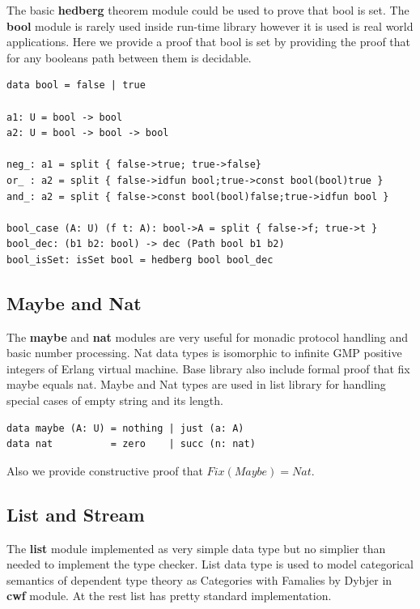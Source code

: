 \documentclass{article}
\begin{document}
The basic {\bf hedberg} theorem module could be used to prove that bool is set.
The {\bf bool} module is rarely used inside run-time library
however it is used is real world applications. Here we provide a proof
that bool is set by providing the proof that for any booleans path
between them is decidable.

\begin{lstlisting}[mathescape=true]
data bool = false | true

a1: U = bool -> bool
a2: U = bool -> bool -> bool

neg_: a1 = split { false->true; true->false}
or_ : a2 = split { false->idfun bool;true->const bool(bool)true }
and_: a2 = split { false->const bool(bool)false;true->idfun bool }

bool_case (A: U) (f t: A): bool->A = split { false->f; true->t }
bool_dec: (b1 b2: bool) -> dec (Path bool b1 b2)
bool_isSet: isSet bool = hedberg bool bool_dec
\end{lstlisting}

\subsection{Maybe and Nat}

The {\bf maybe} and {\bf nat} modules are very useful for monadic protocol handling
and basic number processing. Nat data types is isomorphic
to infinite GMP positive integers of Erlang virtual machine.
Base library also include formal proof that fix maybe equals nat.
Maybe and Nat types are used in list library for handling special cases
of empty string and its length.

\begin{lstlisting}[mathescape=true]
data maybe (A: U) = nothing | just (a: A)
data nat          = zero    | succ (n: nat)
\end{lstlisting}

Also we provide constructive proof that $Fix(Maybe) = Nat$.

\subsection{List and Stream}

The {\bf list} module implemented as very simple data type but no simplier
than needed to implement the type checker. List data type is
used to model categorical semantics of dependent type theory
as Categories with Famalies by Dybjer in {\bf cwf} module.
At the rest list has pretty standard implementation.
\end{document}
